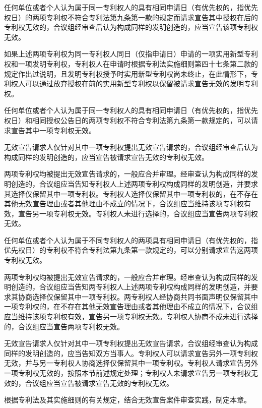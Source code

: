 任何单位或者个人认为属于同一专利权人的具有相同申请日（有优先权的，指优先权日）的两项专利权不符合专利法第九条第一款的规定而请求宣告其中授权在后的专利权无效的，合议组经审查后认为构成同样的发明创造的，应当宣告该项专利权无效。

如果上述两项专利权为同一专利权人同日（仅指申请日）申请的一项实用新型专利权和一项发明专利权，专利权人在申请时根据专利法实施细则第四十七条第二款的规定作出过说明，且发明专利权授予时实用新型专利权尚未终止，在此情形下，专利权人可以通过放弃授权在前的实用新型专利权以保留被请求宣告无效的发明专利权。

任何单位或者个人认为属于同一专利权人的具有相同申请日（有优先权的，指优先权日）和相同授权公告日的两项专利权不符合专利法第九条第一款规定的，可以请求宣告其中一项专利权无效。

无效宣告请求人仅针对其中一项专利权提出无效宣告请求的，合议组经审查后认为构成同样的发明创造的，应当宣告被请求宣告无效的专利权无效。

两项专利权均被提出无效宣告请求的，一般应合并审理。经审查认为构成同样的发明创造的，合议组应当告知专利权人上述两项专利权构成同样的发明创造，并要求其选择仅保留其中一项专利权。专利权人选择仅保留其中一项专利权的，在不存在其他无效宣告理由或者其他理由不成立的情况下，合议组应当维持该项专利权有效，宣告另一项专利权无效。专利权人未进行选择的，合议组应当宣告两项专利权无效。

任何单位或者个人认为属于不同专利权人的两项具有相同申请日（有优先权的，指优先权日）的专利权不符合专利法第九条第一款规定的，可以分别请求宣告这两项专利权无效。

两项专利权均被提出无效宣告请求的，一般应合并审理。经审查认为构成同样的发明创造的，合议组应当告知两专利权人上述两项专利权构成同样的发明创造，并要求其协商选择仅保留其中一项专利权。两专利权人经协商共同书面声明仅保留其中一项专利权的，在不存在其他无效宣告理由或者其他理由不成立的情况下，合议组应当维持该项专利权有效，宣告另一项专利权无效。专利权人协商不成未进行选择的，合议组应当宣告两项专利权无效。

无效宣告请求人仅针对其中一项专利权提出无效宣告请求，合议组经审查认为构成同样的发明创造的，应当告知双方当事人。专利权人可以请求宣告另外一项专利权无效，并与另一专利权人协商选择仅保留其中一项专利权。专利权人请求宣告另外一项专利权无效的，按照本节前述规定处理；专利权人未请求宣告另一项专利权无效的，合议组应当宣告被请求宣告无效的专利权无效。

根据专利法及其实施细则的有关规定，结合无效宣告案件审查实践，制定本章。

